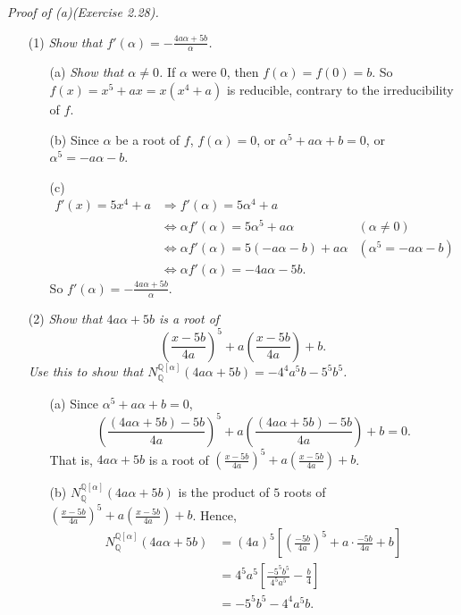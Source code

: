 \documentclass{article}
\begin{document}
\emph{Proof of (a)(Exercise 2.28).}
\begin{enumerate}
\item[(1)]
\emph{Show that $f'(\alpha) = -\frac{4a\alpha+5b}{\alpha}$.}
  \begin{enumerate}
  \item[(a)]
  \emph{Show that $\alpha \neq 0$.}
  If $\alpha$ were $0$, then $f(\alpha) = f(0) = b$.
  So $f(x) = x^5+ax = x(x^4+a)$ is reducible, contrary to the irreducibility of $f$.
  \item[(b)]
  Since $\alpha$ be a root of $f$,
  $f(\alpha) = 0$,
  or $\alpha^5 + a\alpha + b = 0$,
  or $\alpha^5 = -a\alpha-b$.
  \item[(c)]
  \begin{align*}
  f'(x) = 5x^4 + a
  &\Longrightarrow
  f'(\alpha) = 5\alpha^4 + a \\
  &\Longleftrightarrow
  \alpha f'(\alpha) = 5\alpha^5 + a\alpha
    &(\alpha \neq 0) \\
  &\Longleftrightarrow
  \alpha f'(\alpha) = 5(-a\alpha-b) + a\alpha
    &(\alpha^5 = -a\alpha-b) \\
  &\Longleftrightarrow
  \alpha f'(\alpha) = -4a\alpha-5b.
  \end{align*}
  So $f'(\alpha) = -\frac{4a\alpha+5b}{\alpha}$.
  \end{enumerate}
\item[(2)]
\emph{Show that $4a\alpha+5b$ is a root of
$$\left( \frac{x-5b}{4a} \right)^5 + a\left( \frac{x-5b}{4a} \right) + b.$$
Use this to show that
$N_{\mathbb{Q}}^{\mathbb{Q}[\alpha]}(4a\alpha+5b) = -4^4a^5b-5^5b^5$.}
  \begin{enumerate}
  \item[(a)]
  Since $\alpha^5 + a\alpha + b = 0$,
  $$\left( \frac{(4a\alpha+5b)-5b}{4a} \right)^5
    + a\left( \frac{(4a\alpha+5b)-5b}{4a} \right) + b = 0.$$
  That is, $4a\alpha+5b$ is a root of
  $\left( \frac{x-5b}{4a} \right)^5 + a\left( \frac{x-5b}{4a} \right) + b$.
  \item[(b)]
  $N_{\mathbb{Q}}^{\mathbb{Q}[\alpha]}(4a\alpha+5b)$ is the product of $5$ roots of
  $\left( \frac{x-5b}{4a} \right)^5 + a\left( \frac{x-5b}{4a} \right) + b$.
  Hence,
  \begin{align*}
  N_{\mathbb{Q}}^{\mathbb{Q}[\alpha]}(4a\alpha+5b)
  &= (4a)^5\left[ \left(\frac{-5b}{4a}\right)^5 + a \cdot \frac{-5b}{4a} + b \right] \\
  &= 4^5a^5\left[ \frac{-5^5b^5}{4^5a^5} - \frac{b}{4} \right] \\
  &= -5^5b^5-4^4a^5b.

\end{align*}
\end{enumerate}
\end{enumerate}
\end{document}
